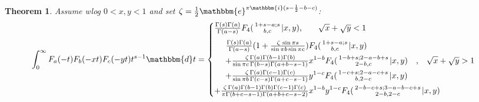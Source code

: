 \documentclass[12pt]{article}
\newcommand{\ee}[0] {\mathbbm{e}}
\newcommand{\ii}[0] {\mathbbm{i}}
\newcommand{\dd}[0] {\mathbbm{d}}
\numberwithin{equation}{section}
\newtheorem{theorem}{Theorem}[section]
\newcommand{\ArgS}[3] {( \begin{smallmatrix} #1 \\ #2 \end{smallmatrix} | {#3})}
\newcommand{\HypJ}[2] {F_{#1}(#2)}
\newcommand{\appellFfourS}[6]    {F_4 \ArgS{{#1};{#2}}{{#3},{#4}}{{#5},{#6}}}
\begin{document}
\begin{theorem}
\label{thm_int_jajbjc}
Assume wlog $0 < x, y < 1$ and set $\zeta = \frac{1}{2}\ee^{\pi \ii (s-\frac12-b-c)}$:
\begin{equation*}
\int_{0}^{\infty} \HypJ{a}{- t} \HypJ{b}{-x t} \HypJ{c}{-y t} t^{s-1} \dd t = 
\begin{cases}
\tfrac{\Gamma(s) \Gamma(a)}{\Gamma(a-s)} \appellFfourS{1+s-a}{s}{b}{c}{x}{y} \text{,} \quad \quad \sqrt{x} + \sqrt{y} < 1\\
\vspace{-8	pt}\\
\begin{aligned}
\tfrac{\Gamma (s)\Gamma (a)}{\Gamma(a-s)}(1+\tfrac{\zeta \, \sin \pi s}{\sin \pi b \sin \pi c}) &\appellFfourS{1+s-a}{s}{b}{c}{x}{y}\\
+\tfrac{\zeta \, \Gamma (a) \Gamma (b-1) \Gamma (b)}{\sin \pi  c \, \Gamma (b-s) \Gamma (a+b-s-1)} & x^{1-b}\appellFfourS{1-b+s}{2-a-b+s}{2-b}{c}{x}{y} \quad \text{,} \quad \sqrt{x} + \sqrt{y} > 1\\
+\tfrac{\zeta \, \Gamma (a) \Gamma (c-1) \Gamma (c)}{\sin \pi  b \, \Gamma (c-s) \Gamma (a+c-s-1)} &y^{1-c} \appellFfourS{1-c+s}{2-a-c+s}{b}{2-c}{x}{y}\\
+\tfrac{\zeta \,  \Gamma (a) \Gamma (b-1) \Gamma (b) \Gamma (c-1) \Gamma (c)}{\pi  \Gamma (b+c-s-1) \Gamma
   (a+b+c-s-2)} & x^{1-b}y^{1-c} \appellFfourS{2-b-c+s}{3-a-b-c+s}{2-b}{2-c}{x}{y}\\
\end{aligned}
\end{cases}
\end{equation*}
\end{theorem}
\end{document}
